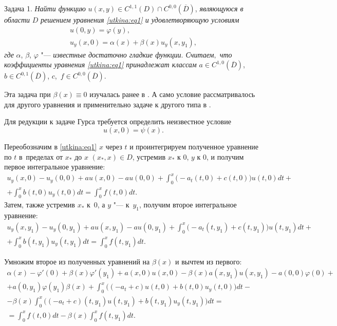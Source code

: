 \smallskip

\hypertarget{utask1}{}

{\small  \sc Задача 1.} \textit{Найти функцию} $u(x, y) \in C^{1,1} ( D ) \cap C^{0, 0}( {\overline D })$, \textit{являющуюся в области}  $D$ \textit{решением уравнения \eqref{utkina:eq1} и удовлетворяющую условиям}
\begin{gather}
\label{utkina:eq2}
u( 0, y) = \varphi ( y ),
\\
\label{utkina:eq3}
u_y  ( x, 0 ) = \alpha (x) + \beta (x)u_y  ( x, y_1 ),
\end{gather}
{\it  где} $\alpha$, $\beta$, $\varphi $ "--- \textit{известные достаточно гладкие функции$.$ 
Считаем$,$ что коэффициенты уравнения \eqref{utkina:eq1} принадлежат классам } $a \in C^{1, 0}(\overline D )$, $ b \in
C^{0, 1}(\overline D )$, $c$,~$f \in C^{0, 0}(\overline D )$.

\smallskip

Эта задача при $\beta (x) \equiv 0$ изучалась ранее в \cite{utkina:bib:Zhegalov2}. 
А само условие
рассматривалось для другого уравнения и применительно задаче к другого типа
в \cite{utkina:bib:Kozhanov}.

Для редукции к задаче Гурса требуется определить неизвестное условие
\begin{equation}
\label{utkina:eq4}
u(x, 0) = \psi ( x ).
\end{equation}



Переобозначим в \eqref{utkina:eq1} $x$ через $t$ и проинтегрируем полученное уравнение по $t$ в~пределах от $x_\ast $ до $x$ $(x_\ast , x) \in D$, устремив $x_\ast $ к 0, $y$ к 0, и получим первое интегральное уравнение:
\begin{multline}
 u_y (x, 0) - u_y (0, 0) + au(x, 0) - au(0, 0) + \int _0^x \bigl( - a_t (t, 0) +
c(t, 0)\bigr)u(t, 0)dt + \\
 + \int _0^x b(t, 0)u_y (t, 0)dt = \int _0^x f(t, 0)dt. 
\end{multline}
Затем, также устремив $x_\ast $ к~0, а $y$ "--- к~$y_1 $, получим второе
интегральное уравнение:
\begin{multline}
 u_y (x,y_1 ) - u_y (0,y_1 ) + au(x,y_1 ) - au(0,y_1 ) + \int _0^x \bigl( -
a_t (t,y_1 ) + c(t,y_1 )\bigr)u(t,y_1 )dt + \\
 + \int _0^x b(t,y_1 )u_y (t,y_1 )dt = \int _0^x f(t,y_1 )dt. 
 \end{multline}




Умножим второе из полученных уравнений на $\beta (x)$ и вычтем из первого:
\begin{multline}
\label{utkina:eq5}
 \alpha (x) - {\varphi }'(0) + \beta (x){\varphi }'(y_1 ) + a(x, 0)u(x, 0) -
\beta (x)a(x,y_1 )u(x,y_1 ) - a(0, 0)\varphi (0) + \\
 + a(0,y_1 )\varphi (y_1 )\beta (x) + \int _0^x \bigl(( - a_t + c)u(t, 0) +
b(t, 0)u_y (t, 0)\bigr)dt - \\
 - \beta (x)\int _0^x \bigl(( - a_t + c)(t,y_1 )u(t,y_1 )  + b(t,y_1 )u_y (t,y_1 )\bigr)dt = \\ = \int _0^x f(t, 0)dt - \beta
(x)\int _0^x f(t,y_1 )dt. 
\end{multline}



